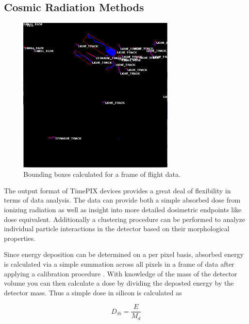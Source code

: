 \subsection{Cosmic Radiation Methods}
\label{sec:Rad-Methods}

\begin{figure}[H]
	\begin{center}
	\includegraphics[width=0.7\textwidth]{figures/clustering.png}
	\caption{Bounding boxes calculated for a frame of flight data.}
	\label{clusterframe}
	\end{center}
\end{figure}

The output format of TimePIX devices provides a great deal of flexibility in terms of data analysis. The data can provide both a simple absorbed dose from ionizing radiation as well as insight into more detailed dosimetric endpoints like dose equivalent. Additionally a clustering procedure can be performed to analyze individual particle interactions in the detector based on their morphological properties.

 Since energy deposition can be determined on a per pixel basis, absorbed energy is calculated via a simple summation across all pixels in a frame of data after applying a calibration procedure \cite{calib}. With knowledge of the mass of the detector volume you can then calculate a dose by dividing the deposted energy by the detector mass. Thus a simple dose in silicon is calculated as



\[D_{Si} = \frac{E}{M_{d}}\]



